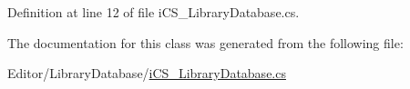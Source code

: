 Definition at line 12 of file i\+C\+S\+\_\+\+Library\+Database.\+cs.



The documentation for this class was generated from the following file\+:\begin{DoxyCompactItemize}
\item 
Editor/\+Library\+Database/\hyperlink{i_c_s___library_database_8cs}{i\+C\+S\+\_\+\+Library\+Database.\+cs}\end{DoxyCompactItemize}
